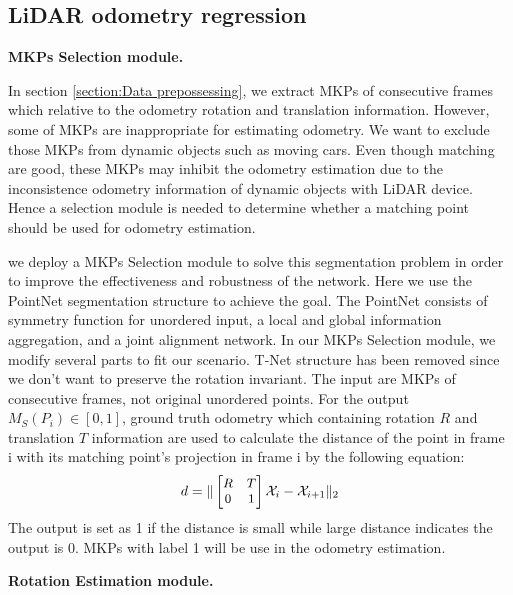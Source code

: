 \documentclass[sigconf]{acmart}
\newcommand{\bfsection}[1]{\vspace*{0.1cm}\noindent\textbf{#1.}}
\begin{document}
\subsection{LiDAR odometry regression}
\label{section:train lodo}
\bfsection{MKPs Selection module}

In section \ref{section:Data prepossessing}, we extract MKPs of consecutive frames which relative to the odometry rotation and translation information. However, some of MKPs are inappropriate for estimating odometry. We want to exclude those MKPs from dynamic objects such as moving cars. Even though matching are good, these MKPs may inhibit the odometry estimation due to the inconsistence odometry information of dynamic objects with LiDAR device. Hence a selection module is needed to determine whether a matching point should be used for odometry estimation. 

we deploy a MKPs Selection module to solve this segmentation problem in order to improve the effectiveness and robustness of the network. Here we use the PointNet segmentation structure to achieve the goal. The PointNet consists of symmetry function for unordered input, a local and global information aggregation, and a joint alignment network. In our MKPs Selection module, we modify several parts to fit our scenario. T-Net structure has been removed since we don't want to preserve the rotation invariant. The input are MKPs of consecutive frames, not original unordered points. For the output $M_S(P_i) \in [0,1]$, ground truth odometry which containing rotation $R$ and translation $T$ information are used to calculate the distance of the point in frame i with its matching point’s projection in frame i by the following equation: 
\begin{align}
\small
    d =\| \begin{bmatrix}
            R & T \\
            0 & 1 
            \end{bmatrix}  \mathcal{X}_i - \mathcal{X}_{i+1} \|_2 
\end{align}
The output is set as 1 if the distance is small while large distance indicates the output is 0. MKPs with label 1 will be use in the odometry estimation.

\bfsection{Rotation Estimation module}
\end{document}
